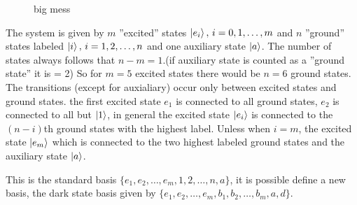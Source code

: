 \begin{figure}[H]
    
    \caption{big mess}
\end{figure}

The system is given by $m$ ''excited'' states $\ket{e_i},\,i = 0,1,\dots,m$ and $n$ ''ground'' states labeled $\ket{i},\,i = 1,2,\dots,n$ and one auxiliary state $\ket{a}$. The number of states always follows that $n-m = 1$.(if auxiliary state is counted as a ''ground state'' it is = 2) So for $m = 5$ excited states there would be $n = 6$ ground states.
The transitions (except for auxialiary) occur only between excited states and ground states. the first excited state $e_1$ is connected to all ground states, $e_2$ is connected to all but $\ket{1}$, in general the excited state $\ket{e_i}$ is connected to the $(n - i)$th ground states with the highest label. Unless when $i = m$, the excited state $\ket{e_m}$ which is connected to the two highest labeled ground states and the auxiliary state $\ket{a}$.

This is the standard basis $\{e_1,e_2,\dots,e_m,1,2,\dots,n,a\}$, it is possible define a new basis, the dark state basis given by $\{e_1,e_2,\dots,e_m,b_1,b_2,\dots,b_{m},a,d\}$.

